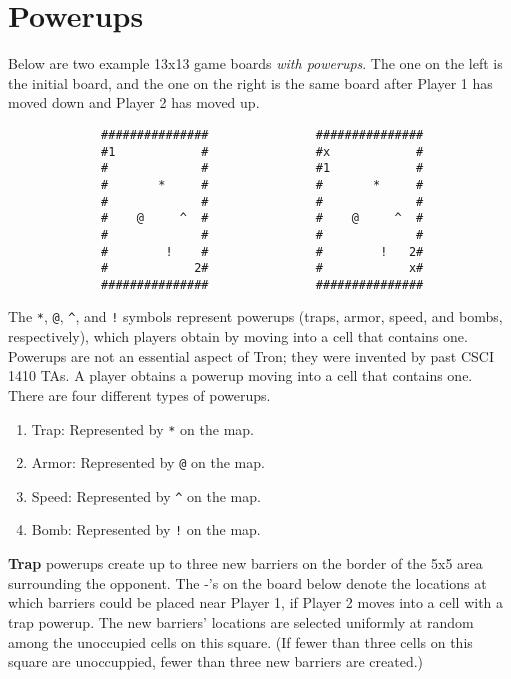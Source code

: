 \documentclass{article}
\begin{document}
\nocite{lanctot13}
\nocite{teuling12}
\nocite{samothrakis10}





\appendix

\section{Powerups}
\label{app:powerups}
Below are two example 13x13 game boards \emph{with powerups}.  The one
on the left is the initial board, and the one on the right is the same
board after Player 1 has moved down and Player 2 has moved up.

\begin{verbatim}
             ###############               ###############
             #1            #               #x            #
             #             #               #1            #
             #       *     #               #       *     #
             #             #               #             #
             #    @     ^  #               #    @     ^  #
             #             #               #             #
             #        !    #               #        !   2#
             #            2#               #            x#
             ###############               ###############
\end{verbatim}

The \verb|*|, \verb|@|, \verb|^|, and \verb|!| symbols represent
powerups (traps, armor, speed, and bombs, respectively), which
players obtain by moving into a cell that contains one.
Powerups are not an essential aspect of Tron;
they were invented by past CSCI 1410 TAs.
%
A player obtains a powerup moving into a cell that contains one.
There are four different types of powerups.

\begin{enumerate}
\item Trap: Represented by \texttt{*} on the map.

\item Armor: Represented by \texttt{@} on the map.

\item Speed: Represented by \texttt{\^} on the map.

\item Bomb: Represented by \texttt{!} on the map.
\end{enumerate}
\fi

\textbf{Trap} powerups create up to three new barriers on the border
of the 5x5 area surrounding the opponent.  The -'s on the board below
denote the locations at which barriers could be placed near Player 1,
if Player 2 moves into a cell with a trap powerup.  The new barriers'
locations are selected uniformly at random among the unoccupied cells
on this square.  (If fewer than three cells on this square are
unoccuppied, fewer than three new barriers are created.)
\end{document}
